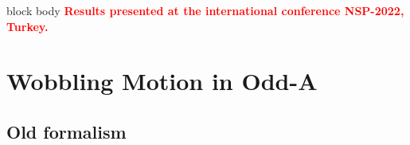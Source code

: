 \documentclass{beamer}
\begin{document}
\begin{frame}
\begin{figure}
	\end{figure}
	\vspace{-0.2cm}
	\begin{beamercolorbox}[rounded=true,shadow=false, wd=\linewidth,]{block body}
		\centering
		\textcolor{red}{\small{\textbf{Results presented at the international conference NSP-2022, Turkey.}}}
	\end{beamercolorbox}
\end{frame}

\section{Wobbling Motion in Odd-A}

\subsection{Old formalism}
\end{document}
